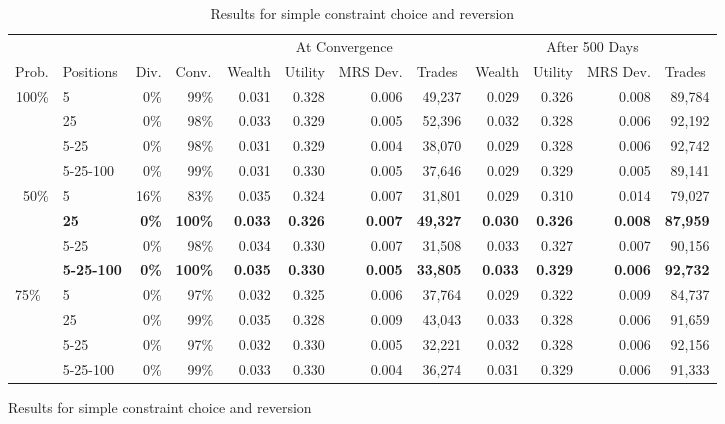 \documentclass[12pt,a4paper,titlepage]{article}
\begin{document}
\begin{figure}[H]
\begin{table}
  \begin{tabular}{rl|rr|rrrr|rrrr}

    \multicolumn{1}{l}{} &  & \multicolumn{1}{l}{} & \multicolumn{1}{l}{} & \multicolumn{ 4}{|c|}{At Convergence} & \multicolumn{ 4}{c}{After 500 Days} \\ 
    \multicolumn{1}{l}{Prob.} & Positions & \multicolumn{1}{l}{Div.} & \multicolumn{1}{l|}{Conv.} & \multicolumn{1}{l}{Wealth} & \multicolumn{1}{l}{Utility} & \multicolumn{1}{l}{MRS Dev.} & \multicolumn{1}{l|}{Trades} & \multicolumn{1}{l}{Wealth} & \multicolumn{1}{l}{Utility} & \multicolumn{1}{l}{MRS Dev.} & \multicolumn{1}{l}{Trades} \\ 
    \hline
    \multicolumn{ 1}{r}{100\%} & 5 & 0\% & 99\% & 0.031 & 0.328 & 0.006 & 49,237 & 0.029 & 0.326 & 0.008 & 89,784 \\ 
    \multicolumn{ 1}{r}{} & 25 & 0\% & 98\% & 0.033 & 0.329 & 0.005 & 52,396 & 0.032 & 0.328 & 0.006 & 92,192 \\ 
    \multicolumn{ 1}{r}{} & 5-25 & 0\% & 98\% & 0.031 & 0.329 & 0.004 & 38,070 & 0.029 & 0.328 & 0.006 & 92,742 \\ 
    \multicolumn{ 1}{r}{} & 5-25-100 & 0\% & 99\% & 0.031 & 0.330 & 0.005 & 37,646 & 0.029 & 0.329 & 0.005 & 89,141 \\ 
    \multicolumn{ 1}{r}{50\%} & 5 & 16\% & 83\% & 0.035 & 0.324 & 0.007 & 31,801 & 0.029 & 0.310 & 0.014 & 79,027 \\ 
    \multicolumn{ 1}{r}{} & \textbf{25} & \textbf{0\%} & \textbf{100\%} & \textbf{0.033} & \textbf{0.326} & \textbf{0.007} & \textbf{49,327} & \textbf{0.030} & \textbf{0.326} & \textbf{0.008} & \textbf{87,959} \\ 
    \multicolumn{ 1}{r}{} & 5-25 & 0\% & 98\% & 0.034 & 0.330 & 0.007 & 31,508 & 0.033 & 0.327 & 0.007 & 90,156 \\ 
    \multicolumn{ 1}{r}{} & \textbf{5-25-100} & \textbf{0\%} & \textbf{100\%} & \textbf{0.035} & \textbf{0.330} & \textbf{0.005} & \textbf{33,805} & \textbf{0.033} & \textbf{0.329} & \textbf{0.006} & \textbf{92,732} \\ 
    \multicolumn{ 1}{l}{75\%} & 5 & 0\% & 97\% & 0.032 & 0.325 & 0.006 & 37,764 & 0.029 & 0.322 & 0.009 & 84,737 \\ 
    \multicolumn{ 1}{r}{} & 25 & 0\% & 99\% & 0.035 & 0.328 & 0.009 & 43,043 & 0.033 & 0.328 & 0.006 & 91,659 \\ 
    \multicolumn{ 1}{l}{} & 5-25 & 0\% & 97\% & 0.032 & 0.330 & 0.005 & 32,221 & 0.032 & 0.328 & 0.006 & 92,156 \\ 
    \multicolumn{ 1}{l}{} & 5-25-100 & 0\% & 99\% & 0.033 & 0.330 & 0.004 & 36,274 & 0.031 & 0.329 & 0.006 & 91,333 \\ 
  \end{tabular}
  \caption{Results for simple constraint choice and reversion}
  \label{tab:bt2}
\end{table}



\end{figure}
\end{document}
